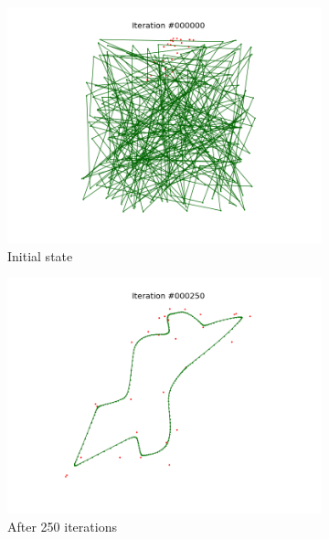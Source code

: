 \documentclass[11pt]{article}
\begin{document}
\begin{figure}
\centering
\begin{subfigure}{.33\textwidth}
  \centering
  \includegraphics[trim={4cm 2cm 4cm 2cm}, clip=true,
  width=\linewidth]{w_0.png}
  \caption{Initial state}
\end{subfigure}%
\begin{subfigure}{.33\textwidth}
  \centering
  \includegraphics[trim={4cm 2cm 4cm 2cm}, clip=true,width=\linewidth]{w_250.png}
  \caption{After 250 iterations}
\end{subfigure}
\begin{subfigure}{.33\textwidth}
  \centering

\end{subfigure}
\end{figure}
\end{document}
